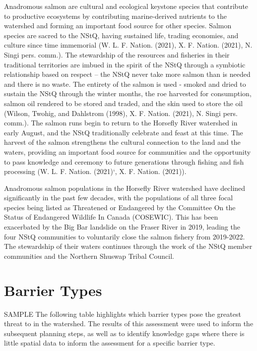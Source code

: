 \documentclass[
  letterpaper,
  DIV=11,
  numbers=noendperiod]{scrreprt}
\begin{document}
Anadromous salmon are cultural and ecological keystone species that
contribute to productive ecosystems by contributing marine-derived
nutrients to the watershed and forming an important food source for
other species. Salmon species are sacred to the NStQ, having sustained
life, trading economies, and culture since time immemorial (W. L. F.
Nation. (2021), X. F. Nation. (2021), N. Singi pers. comm.). The
stewardship of the resources and fisheries in their traditional
territories are imbued in the spirit of the NStQ through a symbiotic
relationship based on respect -- the NStQ never take more salmon than is
needed and there is no waste. The entirety of the salmon is used -
smoked and dried to sustain the NStQ through the winter months, the roe
harvested for consumption, salmon oil rendered to be stored and traded,
and the skin used to store the oil (Wilson, Twohig, and Dahlstrom
(1998), X. F. Nation. (2021), N. Singi pers. comm.). The salmon runs
begin to return to the Horsefly River watershed in early August, and the
NStQ traditionally celebrate and feast at this time. The harvest of the
salmon strengthens the cultural connection to the land and the waters,
providing an important food source for communities and the opportunity
to pass knowledge and ceremony to future generations through fishing and
fish processing (W. L. F. Nation. (2021)`, X. F. Nation. (2021)).

Anadromous salmon populations in the Horsefly River watershed have
declined significantly in the past few decades, with the populations of
all three focal species being listed as Threatened or Endangered by the
Committee On the Status of Endangered Wildlife In Canada (COSEWIC). This
has been exacerbated by the Big Bar landslide on the Fraser River in
2019, leading the four NStQ communities to voluntarily close the salmon
fishery from 2019-2022. The stewardship of their waters continues
through the work of the NStQ member communities and the Northern Shuswap
Tribal Council.

\section*{Barrier Types}\label{barrier-types}


SAMPLE The following table highlights which barrier types pose the
greatest threat to in the watershed. The results of this assessment were
used to inform the subsequent planning steps, as well as to identify
knowledge gaps where there is little spatial data to inform the
assessment for a specific barrier type.
\end{document}
